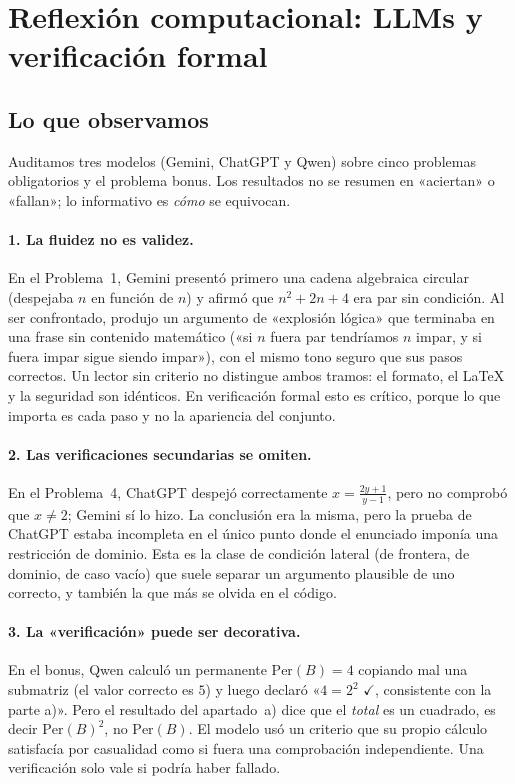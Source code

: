\documentclass[11pt]{article}
\begin{document}
\section{Reflexión computacional: LLMs y verificación formal}

\subsection{Lo que observamos}

Auditamos tres modelos (Gemini, ChatGPT y Qwen) sobre cinco problemas obligatorios y el problema bonus. Los resultados no se resumen en «aciertan» o «fallan»; lo informativo es \emph{cómo} se equivocan.

\paragraph{1. La fluidez no es validez.}
En el Problema~1, Gemini presentó primero una cadena algebraica circular (despejaba $n$ en función de $n$) y afirmó que $n^2+2n+4$ era par sin condición. Al ser confrontado, produjo un argumento de «explosión lógica» que terminaba en una frase sin contenido matemático («si $n$ fuera par tendríamos $n$ impar, y si fuera impar sigue siendo impar»), con el mismo tono seguro que sus pasos correctos. Un lector sin criterio no distingue ambos tramos: el formato, el \LaTeX{} y la seguridad son idénticos. En verificación formal esto es crítico, porque lo que importa es cada paso y no la apariencia del conjunto.

\paragraph{2. Las verificaciones secundarias se omiten.}
En el Problema~4, ChatGPT despejó correctamente $x=\frac{2y+1}{y-1}$, pero no comprobó que $x\neq 2$; Gemini sí lo hizo. La conclusión era la misma, pero la prueba de ChatGPT estaba incompleta en el único punto donde el enunciado imponía una restricción de dominio. Esta es la clase de condición lateral (de frontera, de dominio, de caso vacío) que suele separar un argumento plausible de uno correcto, y también la que más se olvida en el código.

\paragraph{3. La «verificación» puede ser decorativa.}
En el bonus, Qwen calculó un permanente $\mathrm{Per}(B)=4$ copiando mal una submatriz (el valor correcto es $5$) y luego declaró «$4=2^2$ $\checkmark$, consistente con la parte a)». Pero el resultado del apartado~a) dice que el \emph{total} es un cuadrado, es decir $\mathrm{Per}(B)^2$, no $\mathrm{Per}(B)$. El modelo usó un criterio que su propio cálculo satisfacía por casualidad como si fuera una comprobación independiente. Una verificación solo vale si podría haber fallado.
\end{document}
